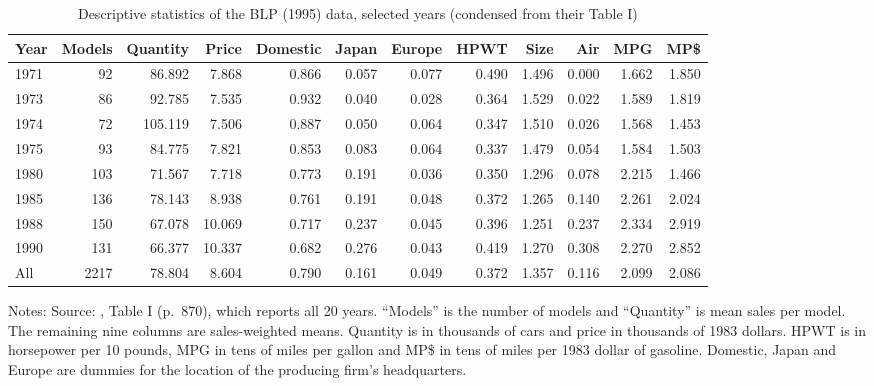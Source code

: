 \begin{table}[htbp]
\centering
\caption{Descriptive statistics of the BLP (1995) data, selected years (condensed from their Table I)}
\label{tab:08-blp-desc}
\footnotesize
\setlength{\tabcolsep}{3.6pt}
\begin{tabular}{@{}lrrrrrrrrrrr@{}}
\toprule
Year & Models & Quantity & Price & Domestic & Japan & Europe & HPWT & Size & Air & MPG & MP\$ \\
\midrule
1971 & 92  & 86.892  & 7.868  & 0.866 & 0.057 & 0.077 & 0.490 & 1.496 & 0.000 & 1.662 & 1.850 \\
1973 & 86  & 92.785  & 7.535  & 0.932 & 0.040 & 0.028 & 0.364 & 1.529 & 0.022 & 1.589 & 1.819 \\
1974 & 72  & 105.119 & 7.506  & 0.887 & 0.050 & 0.064 & 0.347 & 1.510 & 0.026 & 1.568 & 1.453 \\
1975 & 93  & 84.775  & 7.821  & 0.853 & 0.083 & 0.064 & 0.337 & 1.479 & 0.054 & 1.584 & 1.503 \\
1980 & 103 & 71.567  & 7.718  & 0.773 & 0.191 & 0.036 & 0.350 & 1.296 & 0.078 & 2.215 & 1.466 \\
1985 & 136 & 78.143  & 8.938  & 0.761 & 0.191 & 0.048 & 0.372 & 1.265 & 0.140 & 2.261 & 2.024 \\
1988 & 150 & 67.078  & 10.069 & 0.717 & 0.237 & 0.045 & 0.396 & 1.251 & 0.237 & 2.334 & 2.919 \\
1990 & 131 & 66.377  & 10.337 & 0.682 & 0.276 & 0.043 & 0.419 & 1.270 & 0.308 & 2.270 & 2.852 \\
\midrule
All  & 2217 & 78.804 & 8.604  & 0.790 & 0.161 & 0.049 & 0.372 & 1.357 & 0.116 & 2.099 & 2.086 \\
\bottomrule
\end{tabular}

\smallskip
\begin{minipage}{0.97\linewidth}
\footnotesize
Notes: Source: \citet{BerryLevinsohnPakes1995}, Table I (p.~870), which reports all 20 years.
``Models'' is the number of models and ``Quantity'' is mean sales per model. The remaining nine columns
are sales-weighted means. Quantity is in thousands of cars and price in thousands of 1983 dollars. HPWT
is in horsepower per 10 pounds, MPG in tens of miles per gallon and MP\$ in tens of miles per 1983 dollar
of gasoline. Domestic, Japan and Europe are
dummies for the location of the producing firm's headquarters.
\end{minipage}
\end{table}

